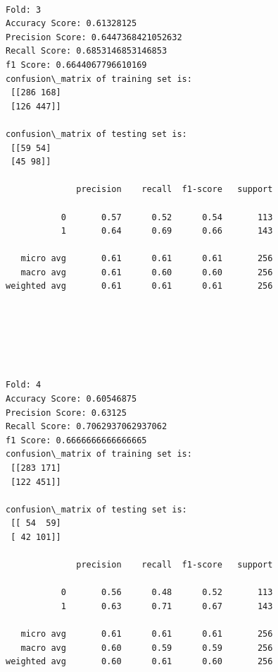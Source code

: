 \documentclass[11pt]{article}
\begin{document}
    \begin{Verbatim}[commandchars=\\\{\}]

Fold: 3
Accuracy Score: 0.61328125
Precision Score: 0.6447368421052632
Recall Score: 0.6853146853146853
f1 Score: 0.6644067796610169
confusion\_matrix of training set is: 
 [[286 168]
 [126 447]] 

confusion\_matrix of testing set is: 
 [[59 54]
 [45 98]] 

              precision    recall  f1-score   support

           0       0.57      0.52      0.54       113
           1       0.64      0.69      0.66       143

   micro avg       0.61      0.61      0.61       256
   macro avg       0.61      0.60      0.60       256
weighted avg       0.61      0.61      0.61       256


    \end{Verbatim}

    \begin{center}
    \end{center}
    { \hspace*{\fill} \\}
    
    \begin{center}
    \end{center}
    { \hspace*{\fill} \\}
    
    \begin{Verbatim}[commandchars=\\\{\}]

Fold: 4
Accuracy Score: 0.60546875
Precision Score: 0.63125
Recall Score: 0.7062937062937062
f1 Score: 0.6666666666666665
confusion\_matrix of training set is: 
 [[283 171]
 [122 451]] 

confusion\_matrix of testing set is: 
 [[ 54  59]
 [ 42 101]] 

              precision    recall  f1-score   support

           0       0.56      0.48      0.52       113
           1       0.63      0.71      0.67       143

   micro avg       0.61      0.61      0.61       256
   macro avg       0.60      0.59      0.59       256
weighted avg       0.60      0.61      0.60       256


    \end{Verbatim}
\end{document}
